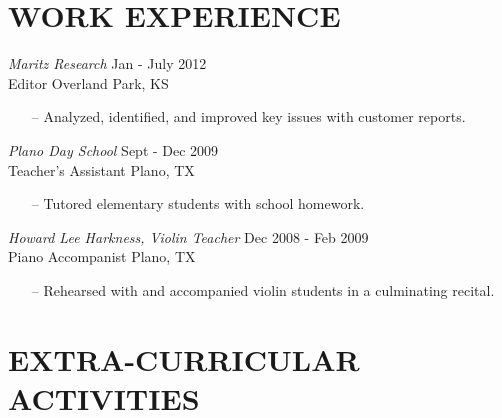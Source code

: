 \documentclass[line,margin]{res}
\begin{document}
\begin{resume}
\section{WORK EXPERIENCE} 
		{\it Maritz Research } \hfill            Jan - July 2012\\
		Editor 		\hfill Overland Park, KS
                 \begin{itemize} [leftmargin=5mm]  \itemsep -2pt %
                 \item[--]  Analyzed, identified, and improved  key issues with customer reports.
                 \end{itemize} 
                 
                {\it Plano Day School} \hfill        Sept - Dec  2009\\
        	Teacher's Assistant \hfill Plano, TX 
		\begin{itemize} [leftmargin=5mm] 
                   \item [--] Tutored elementary students with school homework. 
                   \end{itemize} 

              {\it Howard Lee Harkness, Violin Teacher} \hfill        Dec 2008 - Feb 2009\\
        	Piano Accompanist \hfill Plano, TX 
		\begin{itemize} [leftmargin=5mm] 
                   \item [--] Rehearsed with and accompanied violin students in a culminating recital. 
                   \end{itemize} 
	
\section{EXTRA-CURRICULAR \\ ACTIVITIES}             
	
%
%	
%		


\end{resume}
\end{document}
